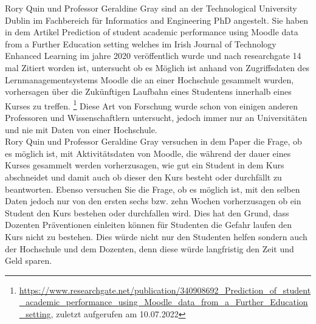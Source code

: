 Rory Quin und Professor Geraldine Gray sind an der \glqq Technological University Dublin\grqq{} im Fachbereich für \glqq Informatics and Engineering
PhD \grqq{} angestelt. Sie haben in dem Artikel \glqq Prediction of student academic performance using Moodle data from a Further Education setting\grqq{} welches im Irish Journal of Technology Enhanced Learning im jahre 2020 veröffentlich wurde und nach researchgate 14 mal Zitiert worden ist, untersucht ob es Möglich ist anhand von Zugriffsdaten des Lernmanagementsystems Moodle die an einer Hochschule gesammelt wurden,
vorhersagen über die Zukünftigen Laufbahn eines Studentens innerhalb eines Kurses zu treffen. \footnote{\url{https://www.researchgate.net/publication/340908692_Prediction_of_student_academic_performance_using_Moodle_data_from_a_Further_Education_setting}, zuletzt aufgerufen am 10.07.2022} Diese Art von Forschung wurde schon von einigen anderen Professoren und Wissenschaftlern untersucht, jedoch immer nur an Universitäten und nie mit Daten von einer Hochschule. \cite[S. 5]{Quinn.2020}
\\ \noindent
Rory Quin und Professor Geraldine Gray versuchen in dem Paper die Frage, ob es möglich ist, mit Aktivitätsdaten von Moodle, die während der dauer eines Kurses gesammelt werden vorherzusagen, wie gut ein Student in dem Kurs abschneidet und damit auch ob dieser den Kurs besteht oder durchfällt zu beantworten. 
Ebenso versuchen Sie die Frage, ob es möglich ist, mit den selben Daten jedoch nur von den ersten sechs bzw. zehn Wochen vorherzusagen ob ein Student den Kurs bestehen oder durchfallen wird. \cite[S. 5]{Quinn.2020}
Dies hat den Grund, dass Dozenten Präventionen einleiten können für Studenten die Gefahr laufen den Kurs nicht zu bestehen. Dies würde nicht nur den Studenten helfen sondern auch der Hochschule und dem Dozenten, denn diese würde langfristig den Zeit und Geld sparen. \cite[S. 15]{Quinn.2020}

